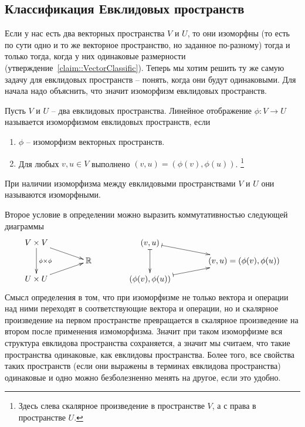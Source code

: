 \subsection{Классификация Евклидовых пространств}

Если у нас есть два векторных пространства $V$ и $U$, то они изоморфны (то есть по сути одно и то же векторное пространство, но заданное по-разному) тогда и только тогда, когда у них одинаковые размерности (утверждение~\ref{claim::VectorClassific}).
Теперь мы хотим решить ту же самую задачу для евклидовых пространств -- понять, когда они будут одинаковыми.
Для начала надо объяснить, что значит изоморфизм евклидовых пространств.

\begin{definition}
Пусть $V$ и $U$ -- два евклидовых пространства.
Линейное отображение $\phi\colon V\to U$ называется изоморфизмом евклидовых пространств, если
\begin{enumerate}
\item $\phi$ -- изоморфизм векторных пространств.

\item Для любых $v,u\in V$ выполнено $(v, u) = (\phi(v), \phi(u))$.%
\footnote{Здесь слева скалярное произведение в пространстве $V$, а с права в пространстве $U$.}
\end{enumerate}
При наличии изоморфизма между евклидовыми пространствами $V$ и $U$ они называются изоморфными.
\end{definition}

Второе условие в определении можно выразить коммутативностью следующей диаграммы
\[
\xymatrix@R=6pt@C=40pt{
	{V\times V}\ar[dd]^{\phi\times \phi}\ar[rd]&{}&{(v,u)}\ar@{|->}[dd]\ar@{|->}[rd]&{}\\
	{}&{\mathbb R}&{}&{(v,u) = (\phi(v),\phi(u))}\\
	{U\times U}\ar[ru]&{}&{(\phi(v),\phi(u))}\ar@{|->}[ru]&{}
}
\]
Смысл определения в том, что при изоморфизме не только вектора и операции над ними переходят в соответствующие вектора и операции, но и скалярное произведение на первом пространстве превращается в скалярное произведение на втором после применения измоморфизма.
Значит при таком изоморфизме вся структура евклидова пространства сохраняется, а значит мы считаем, что такие пространства одинаковые, как евклидовы пространства.
Более того, все свойства таких пространств (если они выражены в терминах евклидова пространства) одинаковые и одно можно безболезненно менять на другое, если это удобно.

